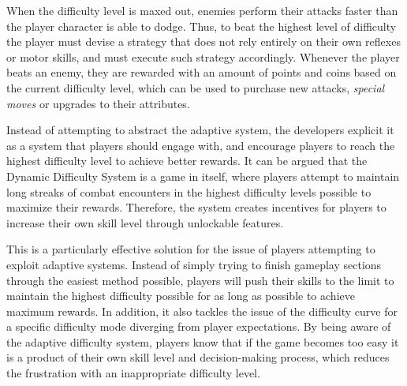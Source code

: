 When the difficulty level is maxed out, enemies perform their attacks faster than the player character is able to dodge. Thus, to beat the highest level of difficulty the player must devise a strategy that does not rely entirely on their own reflexes or motor skills, and must execute such strategy accordingly. Whenever the player beats an enemy, they are rewarded with an amount of points and coins based on the current difficulty level, which can be used to purchase new attacks, \emph{special moves} or upgrades to their attributes.


Instead of attempting to abstract the adaptive system, the developers explicit it as a system that players should engage with, and encourage players to reach the highest difficulty level to achieve better rewards. It can be argued that the Dynamic Difficulty System is a game in itself, where players attempt to maintain long streaks of combat encounters in the highest difficulty levels possible to maximize their rewards. Therefore, the system creates incentives for players to increase their own skill level through unlockable features.

This is a particularly effective solution for the issue of players attempting to exploit adaptive systems. Instead of simply trying to finish gameplay sections through the easiest method possible, players will push their skills to the limit to maintain the highest difficulty possible for as long as possible to achieve maximum rewards. In addition, it also tackles the issue of the difficulty curve for a specific difficulty mode diverging from player expectations. By being aware of the adaptive difficulty system, players know that if the game becomes too easy it is a product of their own skill level and decision-making process, which reduces the frustration with an inappropriate difficulty level.

